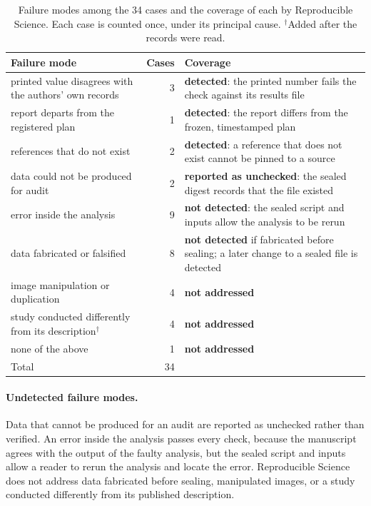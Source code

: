 \vspace{0.5em}
\begin{table}[h]
\centering
\small
\caption{Failure modes among the 34 cases and the coverage of each by Reproducible Science. Each case is
counted once, under its principal cause. $^{\dagger}$Added after the records were read.}
\label{tab:fc-modes}
\begin{tabular}{@{}>{\raggedright\arraybackslash}p{}r>{\raggedright\arraybackslash}p{}@{}}
\toprule
\textbf{Failure mode} & \textbf{Cases} & \textbf{Coverage} \\
\midrule
printed value disagrees with the authors' own records & 3 & \textbf{detected}: the printed number fails the check against its results file \\
report departs from the registered plan & 1 & \textbf{detected}: the report differs from the frozen, timestamped plan \\
references that do not exist & 2 & \textbf{detected}: a reference that does not exist cannot be pinned to a source \\
\midrule
data could not be produced for audit & 2 & \textbf{reported as unchecked}: the sealed digest records that the file existed \\
error inside the analysis & 9 & \textbf{not detected}: the sealed script and inputs allow the analysis to be rerun \\
data fabricated or falsified & 8 & \textbf{not detected} if fabricated before sealing; a later change to a sealed file is detected \\
\midrule
image manipulation or duplication & 4 & \textbf{not addressed} \\
study conducted differently from its description$^{\dagger}$ & 4 & \textbf{not addressed} \\
none of the above & 1 & \textbf{not addressed} \\
\midrule
Total & 34 & \\
\bottomrule
\end{tabular}
\end{table}

\paragraph{Undetected failure modes.} Data that cannot be produced for an audit are reported as
unchecked rather than verified. An error inside the analysis passes every check, because the
manuscript agrees with the output of the faulty analysis, but the sealed script and inputs
allow a reader to rerun the analysis and locate the error. Reproducible Science does not address data
fabricated before sealing, manipulated images, or a study conducted differently from its
published description.

